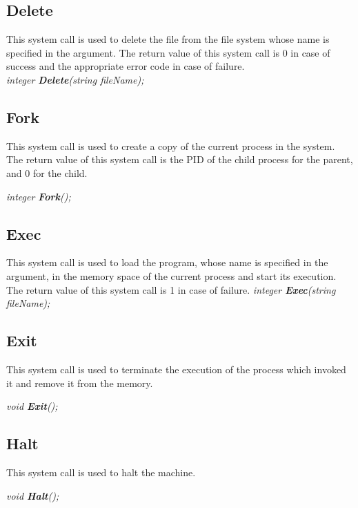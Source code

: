\documentclass[11pt]{article}
\begin{document}
\subsection{Delete}
This system call is used to delete the file from the file system whose name is specified in the
argument. The return value of this system call is 0 in case of success and the appropriate error code in case
of failure.\\

\textit{integer \textbf{Delete}(string fileName);}



\subsection{Fork}
This system call is used to create a copy of the current process in the system. The return value of this system call is the PID of the child process for the parent, and 0 for the child.


\textit{integer \textbf{Fork}();}




\subsection{Exec}
This system call is used to load the program, whose name is specified in the argument, in the
memory space of the current process and start its execution. The return value of this system call is 1 in case of failure.
\textit{integer \textbf{Exec}(string fileName);}




\subsection{Exit}
This system call is used to terminate the execution of the process which invoked it and remove it from the memory.

\textit{void \textbf{Exit}();}


\subsection{Halt}
This system call is used to halt the machine.

\textit{void \textbf{Halt}();}
\end{document}
